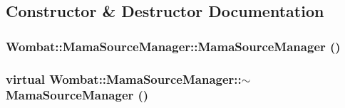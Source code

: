 \subsection{Constructor \& Destructor Documentation}
\hypertarget{classWombat_1_1MamaSourceManager_ab8b625fb94edc7ab2e9667dc5fa6ff5a}{
\subsubsection[{MamaSourceManager}]{\setlength{\rightskip}{0pt plus 5cm}Wombat::MamaSourceManager::MamaSourceManager ()}}
\label{classWombat_1_1MamaSourceManager_ab8b625fb94edc7ab2e9667dc5fa6ff5a}
\hypertarget{classWombat_1_1MamaSourceManager_a1f01b8eeb2c6c25aea10f343818dc631}{
\subsubsection[{$\sim$MamaSourceManager}]{\setlength{\rightskip}{0pt plus 5cm}virtual Wombat::MamaSourceManager::$\sim$MamaSourceManager ()}}
\label{classWombat_1_1MamaSourceManager_a1f01b8eeb2c6c25aea10f343818dc631}


